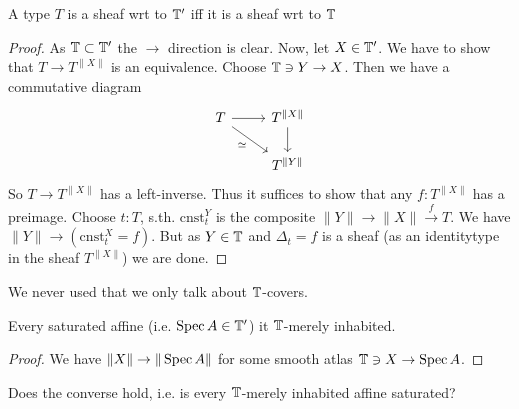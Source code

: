 \documentclass{article}
\begin{document}
\begin{lemma}
    A type $T$ is a sheaf wrt to $\mathbb{T}'$ iff it is a sheaf wrt to $\mathbb{T}$
\end{lemma}
\begin{proof}
    As $\mathbb{T} \subset \mathbb{T}'$ the $\rightarrow$ direction is clear. Now, let $X \in \mathbb{T}'$. We have to show that $T \to T^{\|X\|}$ is an equivalence. Choose $\mathbb{T} \ni Y \to X$. Then we have a commutative diagram
\[\begin{tikzcd}
	T & {T^{\|X\|}} \\
	& {T^{\|Y\|}}
	\arrow[from=1-1, to=1-2]
	\arrow["\simeq"', from=1-1, to=2-2]
	\arrow[from=1-2, to=2-2]
\end{tikzcd}\]
So $T \to T^{\|X\|}$ has a left-inverse. Thus it suffices to show that any $f : T^{\|X\|}$ has a preimage. Choose $t : T$, s.th. $\mathrm{cnst}^Y_t$ is the composite $\|Y\| \to \|X\| \overset{f}{\to} T$. We have $\|Y\| \to (\mathrm{cnst}^X_t = f)$. But as $Y \in \mathbb{T}$ and $\Delta_t = f$ is a sheaf (as an identitytype in the sheaf $T^{\|X\|}$) we are done.
\end{proof}
\begin{rmk}
    We never used that we only talk about $\mathbb{T}$-covers.
\end{rmk}
\begin{lemma}
Every saturated affine (i.e. $\operatorname{Spec} A \in \mathbb{T}'$) it $\mathbb{T}$-merely inhabited.     
\end{lemma}
\begin{proof}
    We have $\|X\| \to \|\operatorname{Spec} A\|$ for some smooth atlas $\mathbb{T} \ni X \to \operatorname{Spec} A$.
\end{proof}

\begin{question}
    Does the converse hold, i.e. is every $\mathbb{T}$-merely inhabited affine saturated?    
\end{question}

\end{document}
